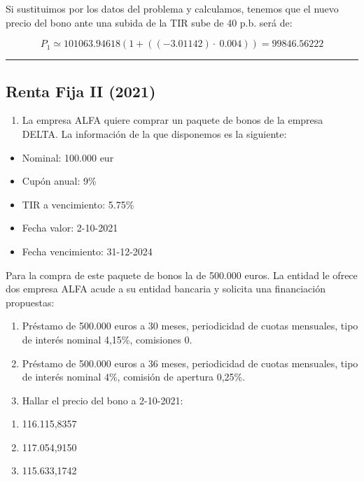 \documentclass[
  letterpaper,
  DIV=11,
  numbers=noendperiod]{scrreprt}
\providecommand{\tightlist}{%
  \setlength{\itemsep}{0pt}\setlength{\parskip}{0pt}}\usepackage{longtable,booktabs,array}
\begin{document}
\begin{tcolorbox}
\begin{tcolorbox}
Si sustituimos por los datos del problema y calculamos, tenemos que el
nuevo precio del bono ante una subida de la TIR sube de 40 p.b. será de:

\[P_1\simeq 101063.94618\left(1+\left(\left(-3.01142\right)\cdot \:0.004\right)\right)=99846.56222\]

\end{tcolorbox}

\begin{center}\rule{0.5\linewidth}{0.5pt}\end{center}

\subsection{Renta Fija II (2021)}\label{renta-fija-ii-2021}

\begin{enumerate}
\def\labelenumi{\arabic{enumi}.}
\tightlist
\item
  La empresa ALFA quiere comprar un paquete de bonos de la empresa
  DELTA. La información de la que disponemos es la siguiente:
\end{enumerate}

\begin{itemize}
\item
  Nominal: 100.000 eur
\item
  Cupón anual: 9\%
\item
  TIR a vencimiento: 5.75\%
\item
  Fecha valor: 2-10-2021
\item
  Fecha vencimiento: 31-12-2024
\end{itemize}

Para la compra de este paquete de bonos la de 500.000 euros. La entidad
le ofrece dos empresa ALFA acude a su entidad bancaria y solicita una
financiación propuestas:

\begin{enumerate}
\def\labelenumi{\arabic{enumi}.}
\item
  Préstamo de 500.000 euros a 30 meses, periodicidad de cuotas
  mensuales, tipo de interés nominal 4,15\%, comisiones 0.
\item
  Préstamo de 500.000 euros a 36 meses, periodicidad de cuotas
  mensuales, tipo de interés nominal 4\%, comisión de apertura 0,25\%.
\item
  Hallar el precio del bono a 2-10-2021:
\end{enumerate}

\begin{enumerate}
\def\labelenumi{\alph{enumi}.}
\item
  116.115,8357
\item
  117.054,9150
\item
  115.633,1742
\end{enumerate}


\end{tcolorbox}
\end{document}
